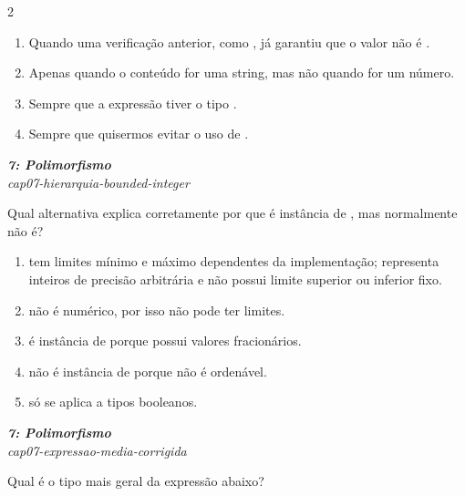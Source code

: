 \documentclass[a4paper,10pt,brazil]{article}
\begin{document}
\begin{multicols}{2}
\begin{enumerate}
  \item Quando uma verificação anterior, como , já garantiu que o valor não é .

  \item Apenas quando o conteúdo for uma string, mas não quando for um número.

  \item Sempre que a expressão tiver o tipo .

  \item Sempre que quisermos evitar o uso de .


\end{enumerate}

\begin{flushright}
  \footnotesize
  \textit{\textbf{7: Polimorfismo}}\\
  \textit{cap07-hierarquia-bounded-integer}\\

\end{flushright}
Qual alternativa explica corretamente por que  é instância de , mas  normalmente não é?
\begin{enumerate}
  \item {} tem limites mínimo e máximo dependentes da implementação;  representa inteiros de precisão arbitrária e não possui limite superior ou inferior fixo.
  \item {} não é numérico, por isso não pode ter limites.
  \item {} é instância de  porque possui valores fracionários.
  \item {} não é instância de  porque não é ordenável.
  \item {} só se aplica a tipos booleanos.

\end{enumerate}

\begin{flushright}
  \footnotesize
  \textit{\textbf{7: Polimorfismo}}\\
  \textit{cap07-expressao-media-corrigida}\\

\end{flushright}
Qual é o tipo mais geral da expressão abaixo?


\end{multicols}
\end{document}
